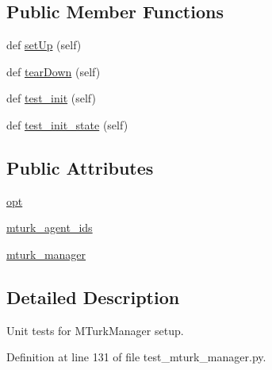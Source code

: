 \subsection*{Public Member Functions}
\begin{DoxyCompactItemize}
\item 
def \hyperlink{classparlai_1_1mturk_1_1core_1_1test_1_1test__mturk__manager_1_1InitTestMTurkManager_ac7aa478ee0d637bd5ca3fb4d40b0d483}{set\+Up} (self)
\item 
def \hyperlink{classparlai_1_1mturk_1_1core_1_1test_1_1test__mturk__manager_1_1InitTestMTurkManager_a915e45dc058a29ebbd1942cd56418cfe}{tear\+Down} (self)
\item 
def \hyperlink{classparlai_1_1mturk_1_1core_1_1test_1_1test__mturk__manager_1_1InitTestMTurkManager_ac038f59a9e49e1378a6fa37c418c6317}{test\+\_\+init} (self)
\item 
def \hyperlink{classparlai_1_1mturk_1_1core_1_1test_1_1test__mturk__manager_1_1InitTestMTurkManager_adf2acf81be629e8f652e7ccf07e7d8b3}{test\+\_\+init\+\_\+state} (self)
\end{DoxyCompactItemize}
\subsection*{Public Attributes}
\begin{DoxyCompactItemize}
\item 
\hyperlink{classparlai_1_1mturk_1_1core_1_1test_1_1test__mturk__manager_1_1InitTestMTurkManager_a3ca0ab7eece61ed39c2bc082a5544c3b}{opt}
\item 
\hyperlink{classparlai_1_1mturk_1_1core_1_1test_1_1test__mturk__manager_1_1InitTestMTurkManager_a5508c8484a1d2ee173b1e8dfab105089}{mturk\+\_\+agent\+\_\+ids}
\item 
\hyperlink{classparlai_1_1mturk_1_1core_1_1test_1_1test__mturk__manager_1_1InitTestMTurkManager_a7b7846e3001c077cc4c27d1b6464af25}{mturk\+\_\+manager}
\end{DoxyCompactItemize}


\subsection{Detailed Description}
\begin{DoxyVerb}Unit tests for MTurkManager setup.
\end{DoxyVerb}
 

Definition at line 131 of file test\+\_\+mturk\+\_\+manager.\+py.



